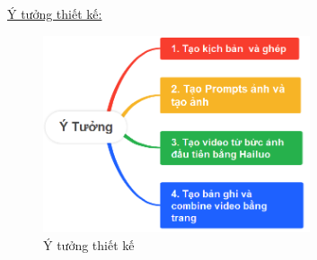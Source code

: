 \underline{Ý tưởng thiết kế:}\\
\begin{figure}[h]
    \centering
    \includegraphics[width=0.7\textwidth]{images/Da1-02.png}
    \caption{Ý tưởng thiết kế}
    
\end{figure}


